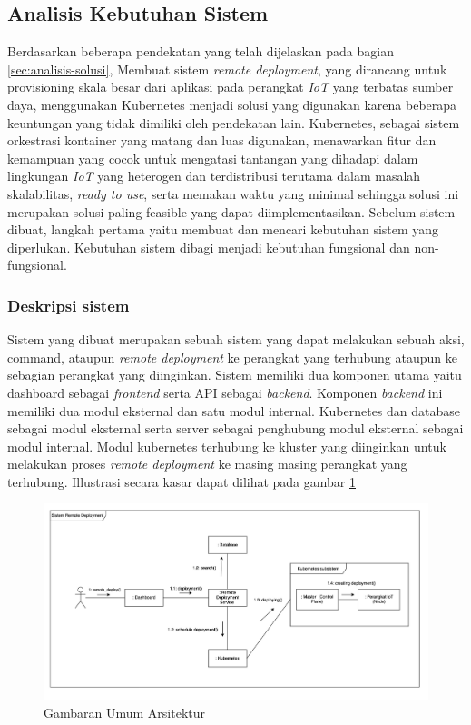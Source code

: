 \subsection{Analisis Kebutuhan Sistem}
\label{sec:analisis-kebutuhan-sistem}

Berdasarkan beberapa pendekatan yang telah dijelaskan pada bagian \ref{sec:analisis-solusi}, Membuat sistem \textit{remote deployment}, yang dirancang untuk provisioning skala besar dari aplikasi pada perangkat \textit{IoT} yang terbatas sumber daya, menggunakan Kubernetes menjadi solusi yang digunakan karena beberapa keuntungan yang tidak dimiliki oleh pendekatan lain. Kubernetes, sebagai sistem orkestrasi kontainer yang matang dan luas digunakan, menawarkan fitur dan kemampuan yang cocok untuk mengatasi tantangan yang dihadapi dalam lingkungan \textit{IoT} yang heterogen dan terdistribusi terutama dalam masalah skalabilitas, \textit{ready to use}, serta memakan waktu yang minimal sehingga solusi ini merupakan solusi paling feasible yang dapat diimplementasikan. Sebelum sistem dibuat, langkah pertama yaitu membuat dan mencari kebutuhan sistem yang diperlukan. Kebutuhan sistem dibagi menjadi kebutuhan fungsional dan non-fungsional.

\subsubsection{Deskripsi sistem}
Sistem yang dibuat merupakan sebuah sistem yang dapat melakukan sebuah aksi, command, ataupun \textit{remote deployment} ke perangkat yang terhubung ataupun ke sebagian perangkat yang diinginkan. Sistem memiliki dua komponen utama yaitu dashboard sebagai \textit{frontend} serta API sebagai \textit{backend}. Komponen \textit{backend} ini memiliki dua modul eksternal dan satu modul internal. Kubernetes dan database sebagai modul eksternal serta server sebagai penghubung modul eksternal sebagai modul internal. Modul kubernetes terhubung ke kluster yang diinginkan untuk melakukan proses \textit{remote deployment} ke masing masing perangkat yang terhubung. Illustrasi secara kasar dapat dilihat pada gambar \ref{fig:gambaran-umum-arsitektur}

\begin{figure}[ht]
  \centering
  \includegraphics[width=1\textwidth]{resources/chapter-3/gambaran-umum-arsitektur-updated.jpg}
  \caption{Gambaran Umum Arsitektur}
  \label{fig:gambaran-umum-arsitektur}
\end{figure}

\pagebreak






